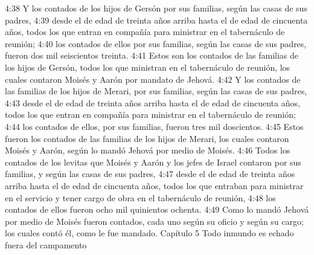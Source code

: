 4:38 Y los contados de los hijos de Gersón por sus familias, según las casas de sus padres,  
4:39 desde el de edad de treinta años arriba hasta el de edad de cincuenta años, todos los que entran en compañía para ministrar en el tabernáculo de reunión;  
4:40 los contados de ellos por sus familias, según las casas de sus padres, fueron dos mil seiscientos treinta.  
4:41 Estos son los contados de las familias de los hijos de Gersón, todos los que ministran en el tabernáculo de reunión, los cuales contaron Moisés y Aarón por mandato de Jehová.  
4:42 Y los contados de las familias de los hijos de Merari, por sus familias, según las casas de sus padres,  
4:43 desde el de edad de treinta años arriba hasta el de edad de cincuenta años, todos los que entran en compañía para ministrar en el tabernáculo de reunión;  
4:44 los contados de ellos, por sus familias, fueron tres mil doscientos.  
4:45 Estos fueron los contados de las familias de los hijos de Merari, los cuales contaron Moisés y Aarón, según lo mandó Jehová por medio de Moisés.  
4:46 Todos los contados de los levitas que Moisés y Aarón y los jefes de Israel contaron por sus familias, y según las casas de sus padres,  
4:47 desde el de edad de treinta años arriba hasta el de edad de cincuenta años, todos los que entraban para ministrar en el servicio y tener cargo de obra en el tabernáculo de reunión,  
4:48 los contados de ellos fueron ocho mil quinientos ochenta.  
4:49 Como lo mandó Jehová por medio de Moisés fueron contados, cada uno según su oficio y según su cargo; los cuales contó él, como le fue mandado.  
Capítulo 5
Todo inmundo es echado fuera del campamento  

